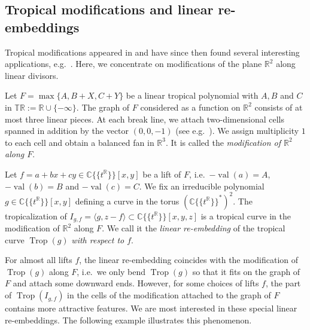\documentclass[11pt]{amsart}
\numberwithin{equation}{section}
\theoremstyle{plain}
\theoremstyle{definition}
\theoremstyle{remark}
\begin{document}
\subsection{Tropical modifications and linear re-embeddings}\label{sec:trop-modif-line}
Tropical modifications appeared in \cite{Mi06} and have since then
found several interesting applications, e.g.\ \cite{AR07,ABBR13,
  BLdM11, Sha10}.  Here, we concentrate on modifications of the plane
${\mathbb{R}}^2$ along linear divisors.

Let $F=\max\{A,B+ X,C+ Y\}$ be a linear tropical polynomial with $A,
B$ and $C$ in $\mathbb{T}{\mathbb{R}}:={\mathbb{R}}\cup\{-\infty\}$. The graph of $F$
considered as a function on ${\mathbb{R}}^2$ consists of at most three linear
pieces. At each break line, we attach two-dimensional cells spanned in
addition by the vector $(0,0,-1)$ (see e.g.\ \cite[Construction
3.3]{AR07}). We assign multiplicity $1$ to each cell and obtain a
balanced fan in ${\mathbb{R}}^3$. It is called the \emph{modification of
  ${\mathbb{R}}^2$ along $F$}.

Let $f=a+bx+cy\in {{\mathbb{C}}\{\!\{t^{\mathbb{R}}\}\!\}}[x,y]$ be a lift of $F$, i.e.\ $-\operatorname{val}(a)=A$,
$-\operatorname{val}(b)=B$ and $-\operatorname{val}(c)=C$.  We fix an irreducible polynomial $g\in
{{\mathbb{C}}\{\!\{t^{\mathbb{R}}\}\!\}}[x,y]$ defining a curve in the torus $({{\mathbb{C}}\{\!\{t^{\mathbb{R}}\}\!\}}^*)^2$. The
tropicalization of $I_{g,f}=\langle g, z-f\rangle\subset {{\mathbb{C}}\{\!\{t^{\mathbb{R}}\}\!\}}[x,y,z]$
is a tropical curve in the modification of ${\mathbb{R}}^2$ along $F$. We call
it the \emph{linear re-embedding} of the tropical curve $\operatorname{Trop}(g)$
\emph{with respect to $f$}.

For almost all lifts $f$, the linear re-embedding coincides with the
modification of $\operatorname{Trop}(g)$ along $F$, i.e.~we only bend $\operatorname{Trop}(g)$ so
that it fits on the graph of $F$ and attach some downward ends.
However, for some choices of lifts $f$, the part of $\operatorname{Trop}(I_{g,f})$
in the cells of the modification attached to the graph of $F$ contains
more attractive features.  We are most interested in these special
linear re-embeddings. The following example illustrates this
phenomenon.
\end{document}
